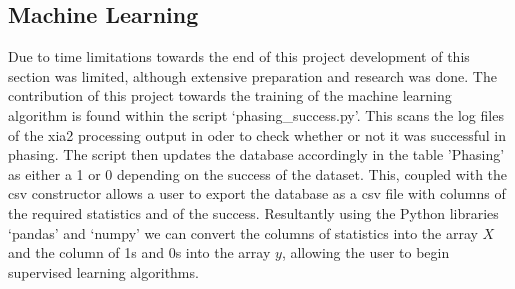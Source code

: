 \documentclass[11pt, a4paper]{article}
\begin{document}
\begin{multicols}{2}
\subsection{Machine Learning}
Due to time limitations towards the end of this project development of this section was limited, although extensive preparation and research was done. The contribution of this project towards the training of the machine learning algorithm is found within the script `phasing\_success.py'. This scans the log files of the xia2 processing output in oder to check whether or not it was successful in phasing. The script then updates the database accordingly in the table 'Phasing' as either a 1 or 0 depending on the success of the dataset. This, coupled with the csv constructor allows a user to export the database as a csv file with columns of the required statistics and of the success. Resultantly using the Python libraries `pandas' and `numpy' we can convert the columns of statistics into the array $X$ and the column of 1s and 0s into the array $y$, allowing the user to begin supervised learning algorithms. 

\end{multicols}
\end{document}
